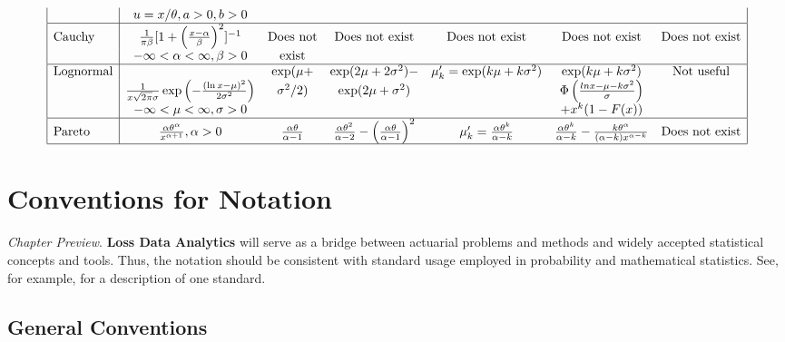 \documentclass[]{book}
\theoremstyle{definition}
\theoremstyle{definition}
\theoremstyle{definition}
\theoremstyle{remark}
\begin{document}
\[{\begin{matrix}
\begin{array}{|l|cccccc|}
           & u=x/\theta ,  a>0 , b>0 & & & &            &            \\
\hline
    \text{Cauchy} & \frac{1}{\pi\beta}[1+\left( \frac{x-\alpha}{\beta}\right)^2]^{-1} &   \text{Does not} & \text{Does not exist} & \text{Does not exist} & \text{Does not exist} & \text{Does not exist} \\
           & -\infty <\alpha <\infty, \beta>0 &      \text{exist} &            &            &            &            \\
\hline
 \text{Lognormal} &    & \exp(\mu+ & \exp(2\mu +2\sigma^2)- & \mu_k'=\exp(k\mu+k\sigma^2) & \exp(k\mu+k\sigma^2) & \text{Not useful} \\
           & \frac{1}{x\sqrt{2\pi}\sigma}\exp\left( -\frac{(\ln x-\mu)^2}{2\sigma^2}\right)  & \sigma^2/2) & \exp(2\mu+\sigma^2) & & \Phi\left( \frac{lnx-\mu-k\sigma^2}{\sigma}\right) &            \\
           & -\infty <\mu <\infty, \sigma>0 &            &            &            & +x^k(1-F(x)) &            \\
\hline
    \text{Pareto} & \frac{\alpha \theta^{\alpha}}{x^{\alpha+1}}, \alpha>0 & \frac{\alpha\theta}{\alpha-1} & \frac{\alpha\theta^2}{\alpha-2}-\left( \frac{\alpha \theta}{\alpha-1}\right)^2 & \mu_k'=\frac{\alpha\theta^k}{\alpha-k} & \frac{\alpha\theta^k}{\alpha-k}-\frac{k\theta^{\alpha}}{(\alpha-k)x^{\alpha-k}} & \text{Does not exist} \\
\hline
\end{array}
\end{matrix}
}
\]

\chapter{Conventions for Notation}\label{S:NotationConvention}

\emph{Chapter Preview}. \textbf{Loss Data Analytics} will serve as a
bridge between actuarial problems and methods and widely accepted
statistical concepts and tools. Thus, the notation should be consistent
with standard usage employed in probability and mathematical statistics.
See, for example, \citep{halperin1965recommended} for a description of
one standard.

\section{General Conventions}\label{S:General}
\end{document}
